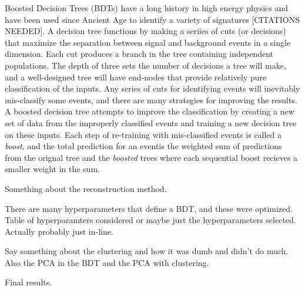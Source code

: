 \label{sec:BDT}
Boosted Decision Trees (BDTs) have a long history in high energy physics and have been used since Ancient Age to identify a variety of signatures [CITATIONS NEEDED]. A decision tree functions by making a seriies of cuts (or decisions) that maximize the separation between signal and background events in a single dimension. Each cut produces a branch in the tree containing independent populations. The depth of three sets the number of decisions a tree will make, and a well-designed tree will have end-nodes that provide relatively pure classification of the inputs. Any series of cuts for identifying events will inevitably mis-classify some events, and there are many strategies for improving the results. A boosted decision tree attempts to improve the classification by creating a new set of data from the improperly classified events and training a new decision tree on these inputs. Each step of re-training with mis-classified events is called a \textit{boost}, and the total prediction for an eventis the weighted sum of predictions from the orignal tree and the \textit{boosted} trees where each sequential boost recieves a smaller weight in the sum.

Something about the reconstruction method.

There are many hyperparameters that define a BDT, and these were optimized. Table of hyperparamters considered or maybe just the hyperparameters selected. Actually probably just in-line.

Say something about the clustering and how it was dumb and didn't do much. Also the PCA in the BDT and the PCA with clustering.

Final results.

